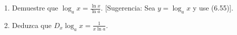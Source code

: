 \item 
    \begin{enumerate}
        \item[(a)] Demuestre que $\log_a x = \frac{\ln x}{\ln a}$. [Sugerencia: Sea $y = \log_a x$ y use (6.55)].
        \item[(b)] Deduzca que $D_x \log_a x = \frac{1}{x \ln a}$.
    \end{enumerate}

